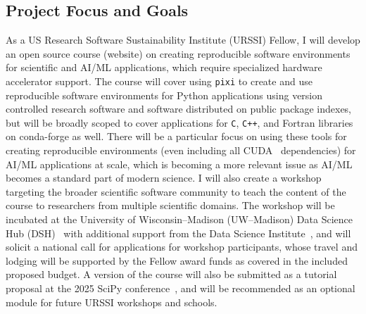 \documentclass[letterpaper, 11pt]{article}
\newcommand{\institute}{UW--Madison}
\newcommand{\fullinstitute}{University of Wisconsin--Madison}
\newcommand{\fullprogram}{US Research Software Sustainability Institute}
\newcommand{\program}{URSSI}
\newcommand{\pixi}{\texttt{pixi}}
\begin{document}
\subsection{Project Focus and Goals}

As a \fullprogram{} (\program{}) Fellow, I will develop an open source course (website) on creating reproducible software environments for scientific and AI/ML applications, which require specialized hardware accelerator support.
The course will cover using \pixi{} to create and use reproducible software environments for Python applications using version controlled research software and software distributed on public package indexes, but will be broadly scoped to cover applications for \texttt{C}, \texttt{C++}, and Fortran libraries on conda-forge as well.
There will be a particular focus on using these tools for creating reproducible environments (even including all CUDA~\cite{CUDA_paper} dependencies) for AI/ML applications at scale, which is becoming a more relevant issue as AI/ML becomes a standard part of modern science.
I will also create a workshop targeting the broader scientific software community to teach the content of the course to researchers from multiple scientific domains.
The workshop will be incubated at the \fullinstitute{} (\institute{}) Data Science Hub (DSH)~\cite{data_science_hub} with additional support from the Data Science Institute~\cite{uwmadison_dsi}, and will solicit a national call for applications for workshop participants, whose travel and lodging will be supported by the Fellow award funds as covered in the included proposed budget.
A version of the course will also be submitted as a tutorial proposal at the 2025 SciPy conference~\cite{scipy-2025}, and will be recommended as an optional module for future URSSI workshops and schools.
%
\end{document}
